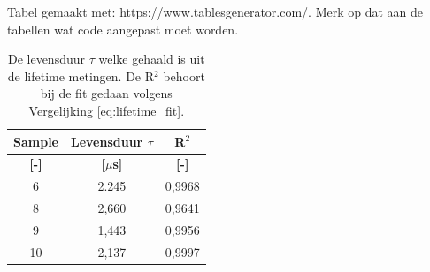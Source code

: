 Tabel gemaakt met: https://www.tablesgenerator.com/. Merk op dat aan de tabellen wat code aangepast moet worden.
\begin{table}[h!]
\centering
\caption{De levensduur $\tau$ welke gehaald is uit de lifetime metingen. De R$^2$ behoort bij de fit gedaan volgens Vergelijking \ref{eq:lifetime_fit}.}
\label{tab:levensduur}
\begin{adjustbox}{max width=\textwidth}
\begin{tabular}{|c|c|c|}
\hline
\textbf{Sample}  & \textbf{Levensduur $\tau$} & \textbf{R$^2$}   \\ \hline
\textbf{{[}-{]}} & \textbf{{[}$\mu$s{]}}      & \textbf{{[}-{]}} \\ \hline
6                & 2.245                      & 0,9968           \\ \hline
8                & 2,660                      & 0,9641           \\ \hline
9                & 1,443                      & 0,9956           \\ \hline
10               & 2,137                      & 0,9997           \\ \hline
\end{tabular}%
\end{adjustbox}
\end{table}